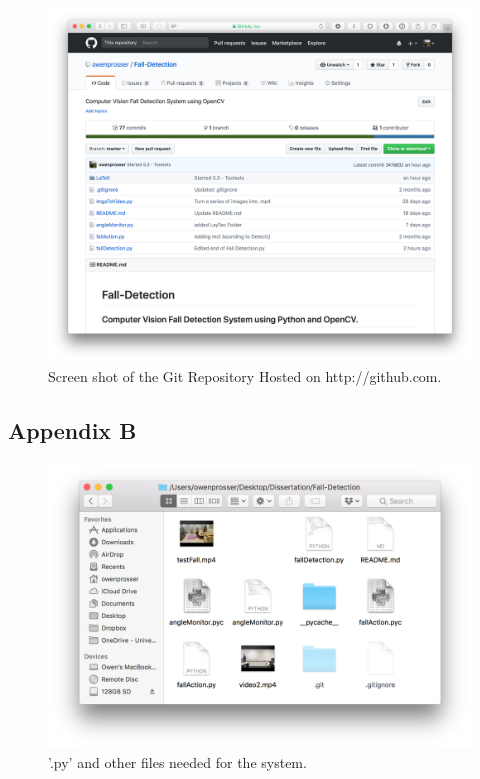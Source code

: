 \documentclass[11pt,a4paper]{report}
\begin{document}
\begin{figure}[H]
 \centering
 \includegraphics[scale = 0.14]{GitRepo.png}
 \caption[Git Repository]{Screen shot of the Git Repository Hosted on http://github.com.}
 \label{fig:GitRepo}
\end{figure}

\subsection{Appendix B}

\begin{figure}[H]
 \centering
 \includegraphics[scale = 0.5]{requiredFiles.png}
 \caption[Necessary Files]{'.py' and other files needed for the system.}
 \label{fig:requiredFiles}
\end{figure}
\end{document}
